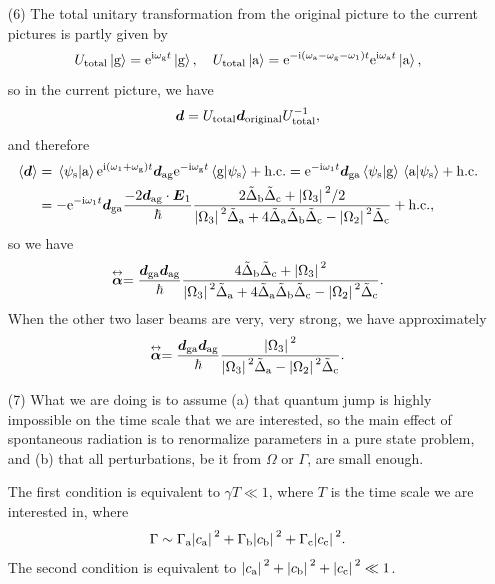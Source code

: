 \documentclass[hyperref, a4paper]{article}
\newcommand*{\ii}{\mathrm{i}}
\newcommand*{\ee}{\mathrm{e}}
\renewcommand{\tensor}[1]{ \stackrel{\leftrightarrow}{\vb*{#1}}}
\begin{document}
\begin{itemize}
\item[(6)] The total unitary transformation from the original picture to the current pictures is partly given by 
\[
    U_\text{total} \ket*{\text{g}} = \ee^{\ii \omega_\text{g} t} \ket*{\text{g}}, \quad 
    U_\text{total} \ket*{\text{a}} = \ee^{- \ii (\omega_\text{a} - \omega_\text{g} - \omega_1) t} \ee^{\ii \omega_\text{a} t} \ket*{\text{a}} , 
\]
so in the current picture, we have 
\[
    \vb*{d} = U_\text{total} \vb*{d}_\text{original} U_\text{total}^{-1}, 
\]
and therefore 
\begin{equation}
    \begin{aligned}
        \expval*{\vb*{d}} &= \braket*{\psi_\text{s}}{\text{a}} \ee^{\ii (\omega_1 + \omega_\text{g}) t} \vb*{d}_\text{ag} \ee^{- \ii \omega_\text{g} t} \braket*{\text{g}}{\psi_\text{s}} + \text{h.c.} = \ee^{- \ii \omega_1 t} \vb*{d}_\text{ga} \braket*{\psi_\text{s}}{\text{g}} \braket*{\text{a}}{\psi_\text{s}} + \text{h.c.} \\
        &= - \ee^{- \ii \omega_1 t} \vb*{d}_\text{ga} \frac{-2 \vb*{d}_\text{ag} \cdot \vb*{E}_1}{\hbar} \frac{2 \tilde{\Delta}_\text{b} \tilde{\Delta}_\text{c} +  \abs*{\Omega_3}^2  / 2 }{ \abs*{\Omega_3}^2 \tilde{\Delta}_\text{a} + 4 \tilde{\Delta}_\text{a} \tilde{\Delta}_\text{b} \tilde{\Delta}_\text{c} - \abs*{\Omega_2}^2 \tilde{\Delta}_\text{c} } + \text{h.c.}  ,
    \end{aligned}
\end{equation}
so we have 
\begin{equation}
    \tensor{\vb*{\alpha}} = \frac{ \vb*{d}_\text{ga} \vb*{d}_\text{ag}}{\hbar} \frac{4 \tilde{\Delta}_\text{b} \tilde{\Delta}_\text{c} +  \abs*{\Omega_3}^2 }{ \abs*{\Omega_3}^2 \tilde{\Delta}_\text{a} + 4 \tilde{\Delta}_\text{a} \tilde{\Delta}_\text{b} \tilde{\Delta}_\text{c} - \abs*{\Omega_2}^2 \tilde{\Delta}_\text{c} } .
\end{equation}
When the other two laser beams are very, very strong, we have approximately 
\begin{equation}
    \tensor{\vb*{\alpha}} = \frac{ \vb*{d}_\text{ga} \vb*{d}_\text{ag}}{\hbar} \frac{ \abs*{\Omega_3}^2 }{ \abs*{\Omega_3}^2 \tilde{\Delta}_\text{a} - \abs*{\Omega_2}^2 \tilde{\Delta}_\text{c} } .
\end{equation}

\item[(7)] What we are doing is to assume (a) that quantum jump is highly impossible on the time scale that we 
are interested, so the main effect of spontaneous radiation is to renormalize parameters in a pure state problem,
and (b) that all perturbations, be it from $\Omega$ or $\Gamma$, are small enough. 

The first condition is equivalent to $\gamma T \ll 1$, where $T$ is the time scale we are interested in, where 
\begin{equation}
    \Gamma \sim \Gamma_\text{a} \abs*{c_\text{a}}^2 + \Gamma_\text{b} \abs*{c_\text{b}}^2 + \Gamma_\text{c} \abs*{c_\text{c}}^2.
\end{equation}
The second condition is equivalent to $\abs*{c_\text{a}}^2 + \abs*{c_\text{b}}^2 + \abs*{c_\text{c}}^2 \ll 1$. 

\end{itemize}
\end{document}
